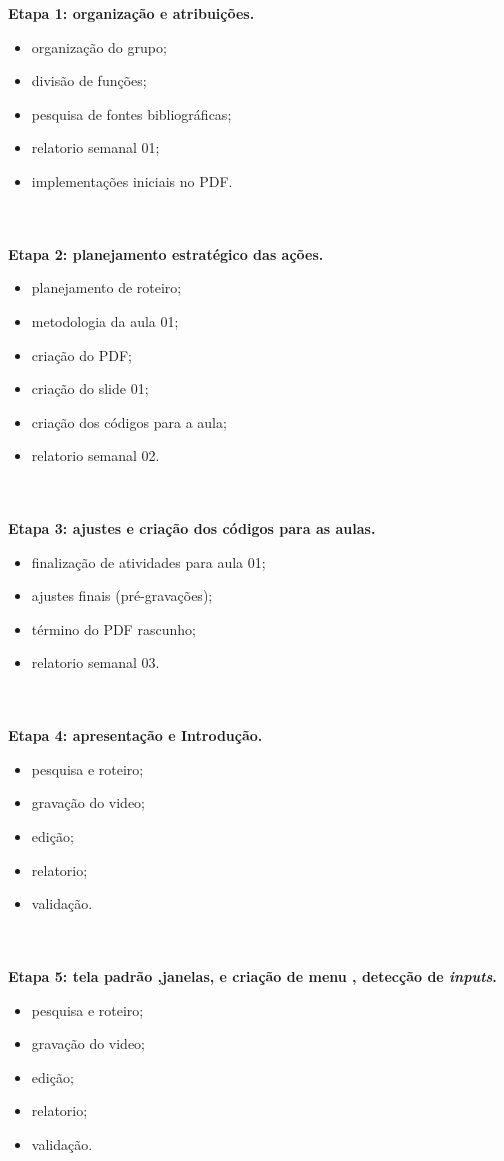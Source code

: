 \documentclass[a4paper,10pt]{article} %
\begin{document}
\textbf{Etapa 1: organização e atribuições.}
\begin{itemize}
  \item organização do grupo;
  \item divisão de funções;
  \item pesquisa de fontes bibliográficas;
  \item relatorio semanal 01;
  \item implementações iniciais no PDF.
\end{itemize}
\\
\\
\textbf{Etapa 2: planejamento estratégico das ações.}
\begin{itemize}
  \item planejamento de roteiro;
  \item metodologia da aula 01;
  \item criação do PDF;
  \item criação do slide 01;
  \item criação dos códigos para a aula;
  \item relatorio semanal 02.
\end{itemize}
\\
\\
\textbf{Etapa 3: ajustes e criação dos códigos para as aulas.}
\begin{itemize}
  \item finalização de atividades para aula 01;
  \item ajustes finais (pré-gravações);
  \item término do PDF rascunho;
  \item relatorio semanal 03.
\end{itemize}
\\
\\
\textbf{Etapa 4: apresentação e Introdução.}
 \begin{itemize}
  \item pesquisa e roteiro;
  \item gravação do video;
  \item  edição;
  \item relatorio;
  \item  validação.
\end{itemize}
\\
\\
\textbf{Etapa 5: tela padrão ,janelas, e criação de menu , detecção de \textit{inputs}.}
 \begin{itemize}
  \item pesquisa e roteiro;
  \item gravação do video;
  \item  edição;
  \item relatorio;
  \item  validação.
\end{itemize}
\end{document}
